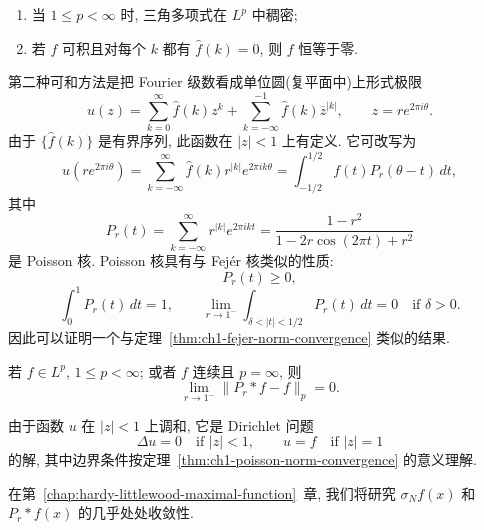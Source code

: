 \begin{Corollary}
\label{cor:ch1-trigonometric-density-uniqueness}
\begin{enumerate}[label=(\arabic*)]
\item 当 $1\le p<\infty$ 时, 三角多项式在 $L^p$ 中稠密;
\item 若 $f$ 可积且对每个 $k$ 都有 $\widehat f(k)=0$, 则 $f$ 恒等于零.
\end{enumerate}
\end{Corollary}

第二种可和方法是把 Fourier 级数看成单位圆(复平面中)上形式极限
\begin{equation}
\label{eq:ch1-fourier-series-unit-disk}
 u(z)=\sum_{k=0}^{\infty}\widehat f(k)z^k
 +\sum_{k=-\infty}^{-1}\widehat f(k)\overline z^{|k|},
 \qquad z=re^{2\pi i\theta}.
\end{equation}
由于 $\{\widehat f(k)\}$ 是有界序列, 此函数在 $|z|<1$ 上有定义. 它可改写为
\[
 u(re^{2\pi i\theta})
 =\sum_{k=-\infty}^{\infty}\widehat f(k)r^{|k|}e^{2\pi ik\theta}
 =\int_{-1/2}^{1/2}f(t)P_r(\theta-t)\,dt,
\]
\hypertarget{chapter-01-page-023}{}
其中
\[
 P_r(t)=\sum_{k=-\infty}^{\infty}r^{|k|}e^{2\pi ikt}
 =\frac{1-r^2}{1-2r\cos(2\pi t)+r^2}
\]
是 Poisson 核. Poisson 核具有与 Fejér 核类似的性质:
\[
 P_r(t)\ge0,
\]
\begin{equation}
\label{eq:ch1-poisson-kernel-properties}
 \int_0^1P_r(t)\,dt=1,
 \qquad
 \lim_{r\to1^-}\int_{\delta<|t|<1/2}P_r(t)\,dt=0
 \quad\text{if }\delta>0.
\end{equation}
因此可以证明一个与定理~\ref{thm:ch1-fejer-norm-convergence} 类似的结果.

\begin{Theorem}
\label{thm:ch1-poisson-norm-convergence}
若 $f\in L^p$, $1\le p<\infty$; 或者 $f$ 连续且 $p=\infty$, 则
\[
 \lim_{r\to1^-}\|P_r*f-f\|_p=0.
\]
\end{Theorem}

由于函数 $u$ 在 $|z|<1$ 上调和, 它是 Dirichlet 问题
\[
 \Delta u=0\quad\text{if }|z|<1,
 \qquad
 u=f\quad\text{if }|z|=1
\]
的解, 其中边界条件按定理~\ref{thm:ch1-poisson-norm-convergence} 的意义理解.

在第~\ref{chap:hardy-littlewood-maximal-function}~章, 我们将研究 $\sigma_Nf(x)$ 和 $P_r*f(x)$ 的几乎处处收敛性.

